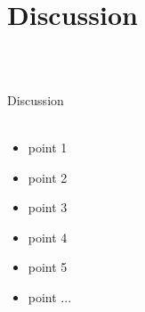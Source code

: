 \documentclass{beamer}
\begin{document}
\section{Discussion}
\begin{frame}{~}
\begin{columns}[onlytextwidth]
\begin{block}{Discussion}
~~\\
~~\\
\begin{itemize}
\item point 1
\vskip0.5cm
\item point 2
\vskip0.5cm
\item point 3 
\vskip0.5cm
\item point 4
\vskip0.5cm
\item point 5
\vskip0.5cm
\item point ...
\vskip0.5cm
~
\end{itemize} 
\end{block}
\end{columns}
\end{frame}
\end{document}
